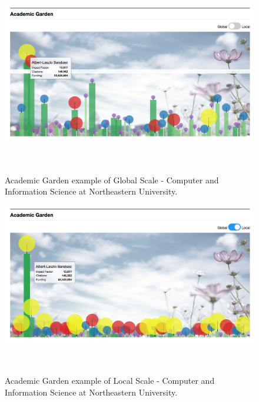 \begin{figure}[!htb]
    \centering
    \includegraphics[width=1\textwidth]{figures/fig-AG-global.png}
    \caption{Academic Garden example of Global Scale - Computer and Information Science at Northeastern University.}~\label{fig-AG-global}
\end{figure}

\begin{figure}[!htb]
    \centering
    \includegraphics[width=1\textwidth]{figures/fig-AG-local.png}
    \caption{Academic Garden example of Local Scale - Computer and Information Science at Northeastern University.}~\label{fig-AG-global}
\end{figure}




















